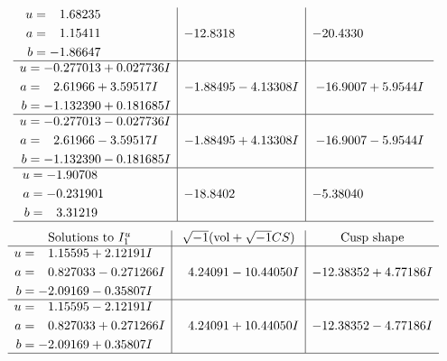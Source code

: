 \documentclass[1p]{elsarticle_modified}
\theoremstyle{definition}
\newcommand{\I}{\sqrt{-1}}
\begin{document}
$$\begin{array}{c|c|c}
\begin{aligned}
u &= \phantom{-}1.68235\phantom{ +0.000000I} \\
a &= \phantom{-}1.15411\phantom{ +0.000000I} \\
b &= -1.86647\phantom{ +0.000000I}\end{aligned}
 & -12.8318\phantom{ +0.000000I} & -20.4330\phantom{ +0.000000I} \\ \hline\begin{aligned}
u &= -0.277013 + 0.027736 I \\
a &= \phantom{-}2.61966 + 3.59517 I \\
b &= -1.132390 + 0.181685 I\end{aligned}
 & -1.88495 - 4.13308 I & -16.9007 + 5.9544 I \\ \hline\begin{aligned}
u &= -0.277013 - 0.027736 I \\
a &= \phantom{-}2.61966 - 3.59517 I \\
b &= -1.132390 - 0.181685 I\end{aligned}
 & -1.88495 + 4.13308 I & -16.9007 - 5.9544 I \\ \hline\begin{aligned}
u &= -1.90708\phantom{ +0.000000I} \\
a &= -0.231901\phantom{ +0.000000I} \\
b &= \phantom{-}3.31219\phantom{ +0.000000I}\end{aligned}
 & -18.8402\phantom{ +0.000000I} & -5.38040\phantom{ +0.000000I}\\
 \hline 
 \end{array}$$\newpage$$\begin{array}{c|c|c}  
\text{Solutions to }I^u_{1}& \I (\text{vol} + \sqrt{-1}CS) & \text{Cusp shape}\\
 \hline 
\begin{aligned}
u &= \phantom{-}1.15595 + 2.12191 I \\
a &= \phantom{-}0.827033 - 0.271266 I \\
b &= -2.09169 - 0.35807 I\end{aligned}
 & \phantom{-}4.24091 - 10.44050 I & -12.38352 + 4.77186 I \\ \hline\begin{aligned}
u &= \phantom{-}1.15595 - 2.12191 I \\
a &= \phantom{-}0.827033 + 0.271266 I \\
b &= -2.09169 + 0.35807 I\end{aligned}
 & \phantom{-}4.24091 + 10.44050 I & -12.38352 - 4.77186 I\\
 \hline 
 \end{array}$$\newpage\newpage\renewcommand{\arraystretch}{1}
\end{document}
